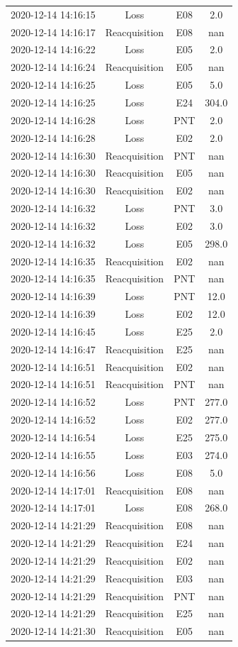 \begin{enumerate}
\begin{longtabu}{cccc}
2020{-}12{-}14 14:16:15&Loss&E08&2.0\\%
2020{-}12{-}14 14:16:17&Reacquisition&E08&nan\\%
2020{-}12{-}14 14:16:22&Loss&E05&2.0\\%
2020{-}12{-}14 14:16:24&Reacquisition&E05&nan\\%
2020{-}12{-}14 14:16:25&Loss&E05&5.0\\%
2020{-}12{-}14 14:16:25&Loss&E24&304.0\\%
2020{-}12{-}14 14:16:28&Loss&PNT&2.0\\%
2020{-}12{-}14 14:16:28&Loss&E02&2.0\\%
2020{-}12{-}14 14:16:30&Reacquisition&PNT&nan\\%
2020{-}12{-}14 14:16:30&Reacquisition&E05&nan\\%
2020{-}12{-}14 14:16:30&Reacquisition&E02&nan\\%
2020{-}12{-}14 14:16:32&Loss&PNT&3.0\\%
2020{-}12{-}14 14:16:32&Loss&E02&3.0\\%
2020{-}12{-}14 14:16:32&Loss&E05&298.0\\%
2020{-}12{-}14 14:16:35&Reacquisition&E02&nan\\%
2020{-}12{-}14 14:16:35&Reacquisition&PNT&nan\\%
2020{-}12{-}14 14:16:39&Loss&PNT&12.0\\%
2020{-}12{-}14 14:16:39&Loss&E02&12.0\\%
2020{-}12{-}14 14:16:45&Loss&E25&2.0\\%
2020{-}12{-}14 14:16:47&Reacquisition&E25&nan\\%
2020{-}12{-}14 14:16:51&Reacquisition&E02&nan\\%
2020{-}12{-}14 14:16:51&Reacquisition&PNT&nan\\%
2020{-}12{-}14 14:16:52&Loss&PNT&277.0\\%
2020{-}12{-}14 14:16:52&Loss&E02&277.0\\%
2020{-}12{-}14 14:16:54&Loss&E25&275.0\\%
2020{-}12{-}14 14:16:55&Loss&E03&274.0\\%
2020{-}12{-}14 14:16:56&Loss&E08&5.0\\%
2020{-}12{-}14 14:17:01&Reacquisition&E08&nan\\%
2020{-}12{-}14 14:17:01&Loss&E08&268.0\\%
2020{-}12{-}14 14:21:29&Reacquisition&E08&nan\\%
2020{-}12{-}14 14:21:29&Reacquisition&E24&nan\\%
2020{-}12{-}14 14:21:29&Reacquisition&E02&nan\\%
2020{-}12{-}14 14:21:29&Reacquisition&E03&nan\\%
2020{-}12{-}14 14:21:29&Reacquisition&PNT&nan\\%
2020{-}12{-}14 14:21:29&Reacquisition&E25&nan\\%
2020{-}12{-}14 14:21:30&Reacquisition&E05&nan\\%
\hline%
\end{longtabu}%
\end{enumerate}

